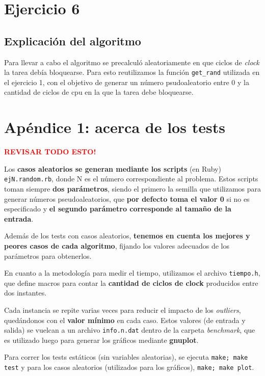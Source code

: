 \documentclass[a4paper]{article}
\begin{document}
\section{Ejercicio 6}

\subsection{Explicación del algoritmo}
Para llevar a cabo el algoritmo se precalculó aleatoriamente en que ciclos
de \textit{clock} la tarea debía bloquearse. Para esto reutilizamos la
función \verb|get_rand| utilizada en el ejercicio 1, con el objetivo de
generar un número psudoaleatorio entre 0 y la cantidad de ciclos de cpu en
la que la tarea debe bloquearse.

\newpage

\section{Apéndice 1: acerca de los tests}


\textcolor{red}{\textbf{REVISAR TODO ESTO!}} \medskip

Los \textbf{casos aleatorios se generan mediante los scripts} (en Ruby) \verb|ejN.random.rb|, donde
N es el número correspondiente al problema. Estos scripts toman siempre \textbf{dos parámetros},
siendo el primero la semilla que utilizamos para generar números pseudoaleatorios, que
\textbf{por defecto toma el valor 0} si no es especificado y \textbf{el segundo parámetro corresponde
al tamaño de la entrada}.

Además de los tests con casos aleatorios, \textbf{tenemos en cuenta los mejores y peores
casos de cada algoritmo}, fijando los valores adecuados de los parámetros para
obtenerlos. \medskip

En cuanto a la metodología para medir el tiempo, utilizamos el archivo \verb|tiempo.h|,
que define macros para contar la \textbf{cantidad de ciclos de clock} producidos entre dos instantes. \medskip

Cada instancia se repite varias veces para reducir el impacto de los \textit{outliers}, quedándonos
con el \textbf{valor mínimo} en cada caso. Estos valores (de entrada y salida) se vuelcan a un archivo
\verb|info.n.dat| dentro de la carpeta \textit{benchmark}, que es utilizado luego para generar los gráficos
mediante \textbf{gnuplot}. \medskip

Para correr los tests estáticos (sin variables aleatorias), se ejecuta \verb|make; make test| y para los
casos aleatorios (utilizados para los gráficos), \verb|make; make plot|.
\end{document}
